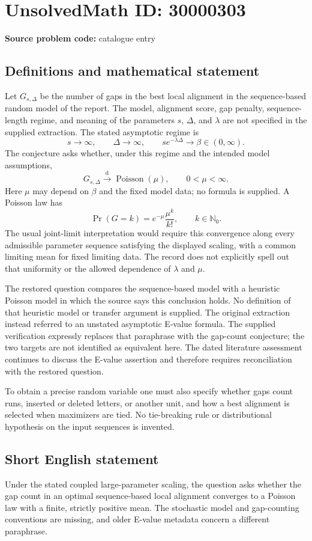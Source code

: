\documentclass[11pt]{article}
\newcommand{\N}{\mathbb{N}}
\begin{document}
\section*{UnsolvedMath ID: 30000303}
\textbf{Source problem code:} catalogue entry
\subsection{Definitions and mathematical statement}
Let $G_{s,\Delta}$ be the number of gaps in the best local alignment in the sequence-based random model of the report. The model, alignment score, gap penalty, sequence-length regime, and meaning of the parameters $s$, $\Delta$, and $\lambda$ are not specified in the supplied extraction. The stated asymptotic regime is
\[
 s\longrightarrow\infty,\qquad\Delta\longrightarrow\infty,
 \qquad s e^{-\lambda\Delta}\longrightarrow\beta\in(0,\infty).
\]
The conjecture asks whether, under this regime and the intended model assumptions,
\[
 G_{s,\Delta}\xrightarrow{\mathrm d}\operatorname{Poisson}(\mu),
 \qquad 0<\mu<\infty.
\]
Here $\mu$ may depend on $\beta$ and the fixed model data; no formula is supplied. A Poisson law has
\[
 \Pr(G=k)=e^{-\mu}\frac{\mu^k}{k!},\qquad k\in\N_0.
\]
The usual joint-limit interpretation would require this convergence along every admissible parameter sequence satisfying the displayed scaling, with a common limiting mean for fixed limiting data. The record does not explicitly spell out that uniformity or the allowed dependence of $\lambda$ and $\mu$.

The restored question compares the sequence-based model with a heuristic Poisson model in which the source says this conclusion holds. No definition of that heuristic model or transfer argument is supplied. The original extraction instead referred to an unstated asymptotic E-value formula. The supplied verification expressly replaces that paraphrase with the gap-count conjecture; the two targets are not identified as equivalent here. The dated literature assessment continues to discuss the E-value assertion and therefore requires reconciliation with the restored question.

To obtain a precise random variable one must also specify whether gaps count runs, inserted or deleted letters, or another unit, and how a best alignment is selected when maximizers are tied. No tie-breaking rule or distributional hypothesis on the input sequences is invented.
\subsection{Short English statement}
Under the stated coupled large-parameter scaling, the question asks whether the gap count in an optimal sequence-based local alignment converges to a Poisson law with a finite, strictly positive mean. The stochastic model and gap-counting conventions are missing, and older E-value metadata concern a different paraphrase.
\end{document}
